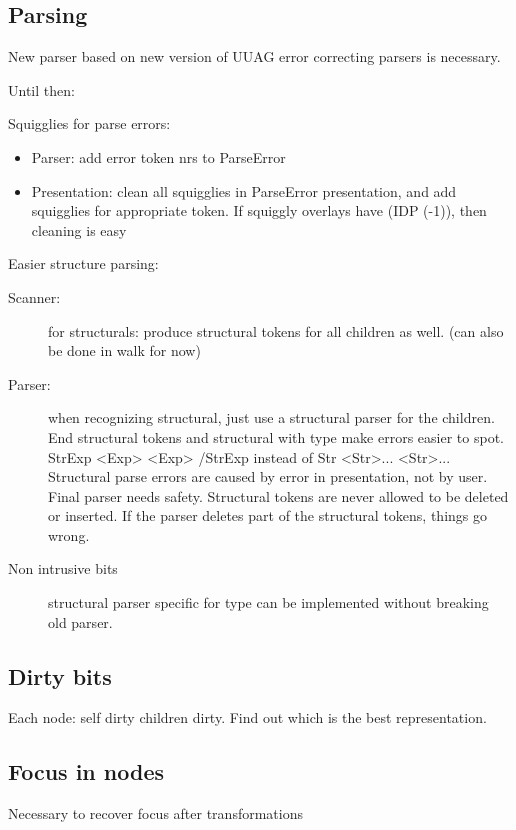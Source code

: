 \documentclass[]{article}
\begin{document}
\subsection{Parsing}
New parser based on new version of UUAG error correcting parsers is necessary.

Until then:

Squigglies for parse errors:
\begin{itemize}
\item Parser: add error token nrs to ParseError
\item Presentation: clean all squigglies in ParseError presentation, and add squigglies for appropriate token. If squiggly overlays have (IDP (-1)), then cleaning is easy
\end{itemize}

Easier structure parsing:
\begin{description}
\item[Scanner:] for structurals: produce structural tokens for all children as well. (can also be done in walk for now)
\item[Parser:] when recognizing structural, just use a structural parser for the children. End structural tokens and structural with type make errors easier to spot. StrExp <Exp> <Exp> /StrExp instead of Str <Str>... <Str>... Structural parse errors are caused by error in presentation, not by user. Final parser needs safety. Structural tokens are never allowed to be deleted or inserted. If the parser deletes part of the structural tokens, things go wrong.
\item[Non intrusive bits] structural parser specific for type can be implemented without breaking old parser.
\end{description}

\subsection{Dirty bits}
Each node: self dirty children dirty. Find out which is the best representation.

\subsection{Focus in nodes}
Necessary to recover focus after transformations
\end{document}
